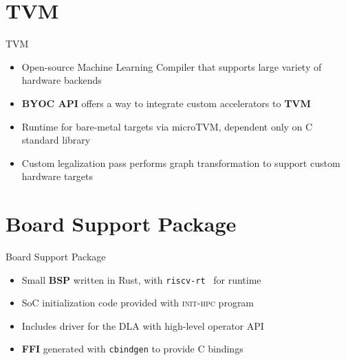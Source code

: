 \section{TVM}
\begin{frame}{TVM}
  \begin{itemize}
          \item Open-source Machine Learning Compiler that supports large variety of hardware backends~\cite{TVM}
          \item \textbf{BYOC API} offers a way to integrate custom accelerators to \textbf{TVM}
          \item Runtime for bare-metal targets via microTVM, dependent only on C standard library
          \item Custom legalization pass performs graph transformation to support custom hardware targets
  \end{itemize}
\end{frame}

\section{Board Support Package}
\begin{frame}{Board Support Package}
  \begin{itemize}
    \item Small \textbf{BSP} written in Rust, with \texttt{riscv-rt}~\cite{riscv_rt} for runtime
    \item SoC initialization code provided with \textsc{init-hpc} program
    \item Includes driver for the DLA with high-level operator API
    \item \textbf{FFI} generated with \texttt{cbindgen} to provide C bindings
  \end{itemize}
\end{frame}


